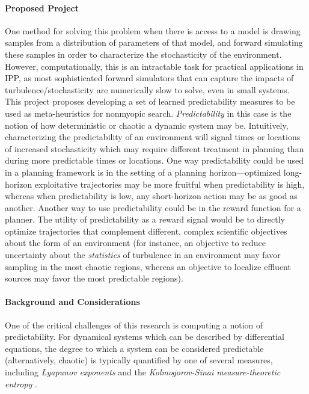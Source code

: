 \paragraph{Proposed Project} 
One method for solving this problem when there is access to a model is drawing samples from a distribution of parameters of that model, and forward simulating these samples in order to characterize the stochasticity of the environment.
However, computationally, this is an intractable task for practical applications in IPP, as most sophisticated forward simulators that can capture the impacts of turbulence/stochasticity are numerically slow to solve, even in small systems.
This project proposes developing a set of learned predictability measures to be used as  meta-heuristics for nonmyopic search.
\emph{Predictability} in this case is the notion of how deterministic or chaotic a dynamic system may be.
Intuitively, characterizing the predictability of an environment will signal times or locations of increased stochasticity which may require different treatment in planning than during more predictable times or locations.
One way predictability could be used in a planning framework is in the setting of a planning horizon---optimized long-horizon exploitative trajectories may be more fruitful when predictability is high, whereas when predictability is low, any short-horizon action may be as good as another.
Another way to use predictability could be in the reward function for a planner. The utility of predictability as a reward signal would be to directly optimize trajectories that complement different, complex scientific objectives about the form of an environment (for instance, an objective to reduce uncertainty about the \emph{statistics} of turbulence in an environment may favor sampling in the most chaotic regions, whereas an objective to localize effluent sources may favor the most predictable regions).

\paragraph{Background and Considerations}
One of the critical challenges of this research is computing a notion of predictability.
For dynamical systems which can be described by differential equations, the degree to which a system can be considered predictable (alternatively, chaotic) is typically quantified by one of several measures, including \emph{Lyapunov exponents} \autocite{wolf1985determining} and the \emph{Kolmogorov-Sinai measure-theoretic entropy} \autocite{frigg2004sense}.

